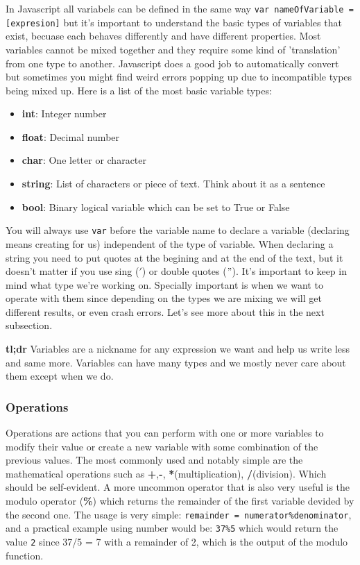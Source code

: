 In Javascript all variabels can be defined in the same way \texttt{var nameOfVariable = [expresion]} but it's important to understand the basic types of variables that exist, becuase each behaves differently and have different properties. Most variables cannot be mixed together and they require some kind of 'translation' from one type to another. Javascript does a good job to automatically convert but sometimes you might find weird errors popping up due to incompatible types being mixed up.
Here is a list of the most basic variable types:
\begin{itemize}
    \item \textbf{int}: Integer number
    \item \textbf{float}: Decimal number
    \item \textbf{char}: One letter or character
    \item \textbf{string}: List of characters or piece of text. Think about it as a sentence
    \item \textbf{bool}: Binary logical variable which can be set to True or False
\end{itemize}

You will always use \texttt{var} before the variable name to declare a variable (declaring means creating for us) independent of the type of variable. When declaring a string you need to put quotes at the begining and at the end of the text, but it doesn't matter if you use sing ($'$) or double quotes ($"$). It's important to keep in mind what type we're working on. Specially important is when we want to operate with them since depending on the types we are mixing we will get different results, or even crash errors. Let's see more about this in the next subsection.  

\large{\textbf{tl;dr}}
Variables are a nickname for any expression we want and help us write less and same more. Variables can have many types and we mostly never care about them except when we do.

\subsubsection{Operations}
\label{subsub:operations}

Operations are actions that you can perform with one or more variables to modify their value or create a new variable with some combination of the previous values. The most commonly used and notably simple are the mathematical operations such as \textbf{+},\textbf{-}, \textbf{*}(multiplication), \textbf{/}(division). Which should be self-evident. A more uncommon operator that is also very useful is the modulo operator (\textbf{\%}) which returns the remainder of the first variable devided by the second one. The usage is very simple: \texttt{remainder = numerator\%denominator}, and a practical example using number would be: \texttt{37\%5} which would return the value \texttt{2} since 37/5 = 7 with a remainder of 2, which is the output of the modulo function. 

